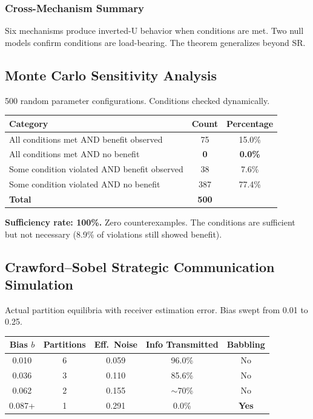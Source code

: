 \documentclass[12pt,letterpaper]{article}
\theoremstyle{definition}
\theoremstyle{remark}
\begin{document}
\subsubsection{Cross-Mechanism Summary}

Six mechanisms produce inverted-U behavior when conditions are met. Two null models confirm conditions are load-bearing. The theorem generalizes beyond SR\@.


\subsection{Monte Carlo Sensitivity Analysis}

500 random parameter configurations. Conditions checked dynamically.

\begin{center}
\begin{tabular}{@{}lcc@{}}
\toprule
\textbf{Category} & \textbf{Count} & \textbf{Percentage} \\
\midrule
All conditions met AND benefit observed & 75 & 15.0\% \\
All conditions met AND no benefit & \textbf{0} & \textbf{0.0\%} \\
Some condition violated AND benefit observed & 38 & 7.6\% \\
Some condition violated AND no benefit & 387 & 77.4\% \\
\midrule
\textbf{Total} & \textbf{500} & \\
\bottomrule
\end{tabular}
\end{center}

\textbf{Sufficiency rate: 100\%.} Zero counterexamples. The conditions are sufficient but not necessary (8.9\% of violations still showed benefit).


\subsection{Crawford--Sobel Strategic Communication Simulation}

Actual partition equilibria with receiver estimation error. Bias swept from 0.01 to 0.25.

\begin{center}
\begin{tabular}{@{}ccccc@{}}
\toprule
\textbf{Bias $b$} & \textbf{Partitions} & \textbf{Eff.\ Noise} & \textbf{Info Transmitted} & \textbf{Babbling} \\
\midrule
0.010 & 6 & 0.059 & 96.0\% & No \\
0.036 & 3 & 0.110 & 85.6\% & No \\
0.062 & 2 & 0.155 & $\sim$70\% & No \\
0.087+ & 1 & 0.291 & 0.0\% & \textbf{Yes} \\
\bottomrule
\end{tabular}
\end{center}
\end{document}
